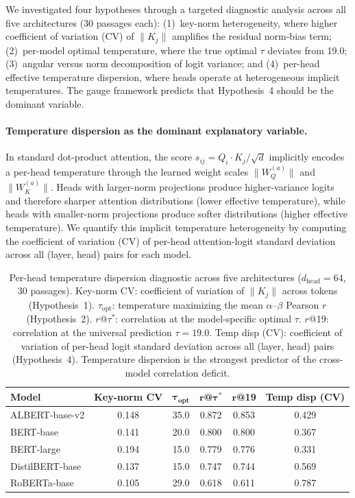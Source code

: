 \documentclass[twoside,11pt]{article}
\begin{document}
We investigated four hypotheses through a targeted diagnostic analysis across all five architectures (30 passages each): (1)~key-norm heterogeneity, where higher coefficient of variation (CV) of $\|K_j\|$ amplifies the residual norm-bias term; (2)~per-model optimal temperature, where the true optimal $\tau$ deviates from 19.0; (3)~angular versus norm decomposition of logit variance; and (4)~per-head effective temperature dispersion, where heads operate at heterogeneous implicit temperatures. The gauge framework predicts that Hypothesis~4 should be the dominant variable.

\paragraph{Temperature dispersion as the dominant explanatory variable.}
In standard dot-product attention, the score $s_{ij} = Q_i \cdot K_j / \sqrt{d}$ implicitly encodes a per-head temperature through the learned weight scales $\|W_Q^{(a)}\|$ and $\|W_K^{(a)}\|$. Heads with larger-norm projections produce higher-variance logits and therefore sharper attention distributions (lower effective temperature), while heads with smaller-norm projections produce softer distributions (higher effective temperature). We quantify this implicit temperature heterogeneity by computing the coefficient of variation (CV) of per-head attention-logit standard deviation across all (layer, head) pairs for each model.

\begin{table}[h]
\centering
\renewcommand{\arraystretch}{1.15}
\begin{tabular}{lccccc}
\hline
\textbf{Model} & \textbf{Key-norm CV} & $\boldsymbol{\tau}_{\textbf{opt}}$ & $\boldsymbol{r}$\textbf{@}$\boldsymbol{\tau^*}$ & $\boldsymbol{r}$\textbf{@19} & \textbf{Temp disp (CV)} \\
\hline
ALBERT-base-v2    & 0.148 & 35.0 & 0.872 & 0.853 & 0.429 \\
BERT-base         & 0.141 & 20.0 & 0.800 & 0.800 & 0.367 \\
BERT-large        & 0.194 & 15.0 & 0.779 & 0.776 & 0.331 \\
DistilBERT-base   & 0.137 & 15.0 & 0.747 & 0.744 & 0.569 \\
RoBERTa-base      & 0.105 & 29.0 & 0.618 & 0.611 & 0.787 \\
\hline
\end{tabular}
\caption{Per-head temperature dispersion diagnostic across five architectures ($d_{\text{head}} = 64$, 30 passages). Key-norm CV: coefficient of variation of $\|K_j\|$ across tokens (Hypothesis~1). $\tau_{\text{opt}}$: temperature maximizing the mean $\alpha$--$\beta$ Pearson $r$ (Hypothesis~2). $r$@$\tau^*$: correlation at the model-specific optimal $\tau$. $r$@19: correlation at the universal prediction $\tau = 19.0$. Temp disp (CV): coefficient of variation of per-head logit standard deviation across all (layer, head) pairs (Hypothesis~4). Temperature dispersion is the strongest predictor of the cross-model correlation deficit.}
\label{tab:temp_dispersion}
\end{table}
\end{document}
